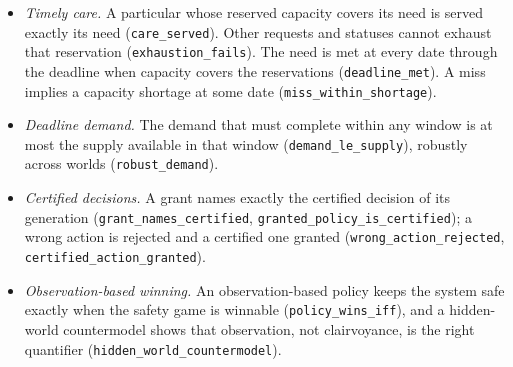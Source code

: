 \documentclass[
]{article}
\providecommand{\tightlist}{%
  \setlength{\itemsep}{0pt}\setlength{\parskip}{0pt}}
\begin{document}
\begin{itemize}
\tightlist
\item
  \emph{Timely care.} A particular whose reserved capacity covers its
  need is served exactly its need (\texttt{care\_served}). Other
  requests and statuses cannot exhaust that reservation
  (\texttt{exhaustion\_fails}). The need is met at every date through
  the deadline when capacity covers the reservations
  (\texttt{deadline\_met}). A miss implies a capacity shortage at some
  date
  (\texttt{m\allowbreak{}i\allowbreak{}s\allowbreak{}s\allowbreak{}\_\allowbreak{}w\allowbreak{}i\allowbreak{}t\allowbreak{}h\allowbreak{}i\allowbreak{}n\allowbreak{}\_\allowbreak{}s\allowbreak{}h\allowbreak{}o\allowbreak{}r\allowbreak{}t\allowbreak{}a\allowbreak{}g\allowbreak{}e}).
\item
  \emph{Deadline demand.} The demand that must complete within any
  window is at most the supply available in that window
  (\texttt{demand\_le\_supply}), robustly across worlds
  (\texttt{robust\_demand}).
\item
  \emph{Certified decisions.} A grant names exactly the certified
  decision of its generation
  (\texttt{g\allowbreak{}r\allowbreak{}a\allowbreak{}n\allowbreak{}t\allowbreak{}\_\allowbreak{}n\allowbreak{}a\allowbreak{}m\allowbreak{}e\allowbreak{}s\allowbreak{}\_\allowbreak{}c\allowbreak{}e\allowbreak{}r\allowbreak{}t\allowbreak{}i\allowbreak{}f\allowbreak{}i\allowbreak{}e\allowbreak{}d},
  \texttt{g\allowbreak{}r\allowbreak{}a\allowbreak{}n\allowbreak{}t\allowbreak{}e\allowbreak{}d\allowbreak{}\_\allowbreak{}p\allowbreak{}o\allowbreak{}l\allowbreak{}i\allowbreak{}c\allowbreak{}y\allowbreak{}\_\allowbreak{}i\allowbreak{}s\allowbreak{}\_\allowbreak{}c\allowbreak{}e\allowbreak{}r\allowbreak{}t\allowbreak{}i\allowbreak{}f\allowbreak{}i\allowbreak{}e\allowbreak{}d});
  a wrong action is rejected and a certified one granted
  (\texttt{w\allowbreak{}r\allowbreak{}o\allowbreak{}n\allowbreak{}g\allowbreak{}\_\allowbreak{}a\allowbreak{}c\allowbreak{}t\allowbreak{}i\allowbreak{}o\allowbreak{}n\allowbreak{}\_\allowbreak{}r\allowbreak{}e\allowbreak{}j\allowbreak{}e\allowbreak{}c\allowbreak{}t\allowbreak{}e\allowbreak{}d},
  \texttt{c\allowbreak{}e\allowbreak{}r\allowbreak{}t\allowbreak{}i\allowbreak{}f\allowbreak{}i\allowbreak{}e\allowbreak{}d\allowbreak{}\_\allowbreak{}a\allowbreak{}c\allowbreak{}t\allowbreak{}i\allowbreak{}o\allowbreak{}n\allowbreak{}\_\allowbreak{}g\allowbreak{}r\allowbreak{}a\allowbreak{}n\allowbreak{}t\allowbreak{}e\allowbreak{}d}).
\item
  \emph{Observation-based winning.} An observation-based policy keeps
  the system safe exactly when the safety game is winnable
  (\texttt{policy\_wins\_iff}), and a hidden-world countermodel shows
  that observation, not clairvoyance, is the right quantifier
  (\texttt{h\allowbreak{}i\allowbreak{}d\allowbreak{}d\allowbreak{}e\allowbreak{}n\allowbreak{}\_\allowbreak{}w\allowbreak{}o\allowbreak{}r\allowbreak{}l\allowbreak{}d\allowbreak{}\_\allowbreak{}c\allowbreak{}o\allowbreak{}u\allowbreak{}n\allowbreak{}t\allowbreak{}e\allowbreak{}r\allowbreak{}m\allowbreak{}o\allowbreak{}d\allowbreak{}e\allowbreak{}l}).
\end{itemize}
\end{document}
